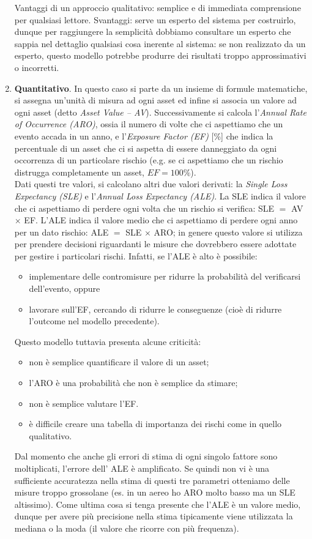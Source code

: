 \begin{enumerate}
\begin{enumerate}
	\end{enumerate}
	Vantaggi di un approccio qualitativo: semplice e di immediata comprensione per qualsiasi lettore. Svantaggi: serve un esperto del sistema per costruirlo, dunque per raggiungere la semplicità dobbiamo consultare un esperto che sappia nel dettaglio qualsiasi cosa inerente al sistema: se non realizzato da un esperto, questo modello potrebbe produrre dei risultati troppo approssimativi o incorretti.
	\item \textbf{Quantitativo}. In questo caso si parte da un insieme di formule matematiche, si assegna un'unità di misura ad ogni asset ed infine si associa un valore ad ogni asset (detto \textit{Asset Value -- AV}). Successivamente si calcola l'\textit{Annual Rate of Occurrence (ARO)}, ossia il numero di volte che ci aspettiamo che un evento accada in un anno, e l'\textit{Exposure Factor (EF)} [\%] che indica la percentuale di un asset che ci si aspetta di essere danneggiato da ogni occorrenza di un particolare rischio (e.g. se ci aspettiamo che un rischio distrugga completamente un asset, $EF=100\%$).\\
	Dati questi tre valori, si calcolano altri due valori derivati: la \textit{Single Loss Expectancy (SLE)} e l'\textit{Annual Loss Expectancy (ALE)}. La SLE indica il valore che ci aspettiamo di perdere ogni volta che un rischio si verifica: SLE $ = $ AV $\times$ EF. L'ALE indica il valore medio che ci aspettiamo di perdere ogni anno per un dato rischio: ALE $ = $ SLE $\times$ ARO; in genere questo valore si utilizza per prendere decisioni riguardanti le misure che dovrebbero essere adottate per gestire i particolari rischi. Infatti, se l'ALE è alto è possibile:
	\begin{itemize}
		\item implementare delle contromisure per ridurre la probabilità del verificarsi dell'evento, oppure
		\item lavorare sull'EF, cercando di ridurre le conseguenze (cioè di ridurre l'outcome nel modello precedente).
	\end{itemize}
	Questo modello tuttavia presenta alcune criticità:
	\begin{itemize}
		\item non è semplice quantificare il valore di un asset;
		\item l'ARO è una probabilità che non è semplice da stimare;
		\item non è semplice valutare l'EF.
		\item è difficile creare una tabella di importanza dei rischi come in quello qualitativo.
	\end{itemize}
	Dal momento che anche gli errori di stima di ogni singolo fattore sono moltiplicati, l'errore dell' ALE  è amplificato. Se quindi non vi è una sufficiente accuratezza nella stima di questi tre parametri otteniamo delle misure troppo grossolane (es. in un aereo ho ARO molto basso ma un SLE altissimo). Come ultima cosa si tenga presente che l'ALE è un valore medio, dunque per avere più precisione nella stima tipicamente viene utilizzata la mediana o la moda (il valore che ricorre con più frequenza). 
\end{enumerate}
